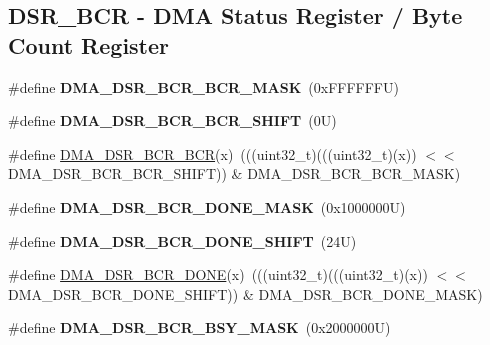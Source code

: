 \subsection*{D\+S\+R\+\_\+\+B\+CR -\/ D\+MA Status Register / Byte Count Register}
\begin{DoxyCompactItemize}
\item 
\mbox{\label{group___d_m_a___register___masks_ga51f1a407dbca889f0b21bb1eeaa1c5d0}} 
\#define {\bfseries D\+M\+A\+\_\+\+D\+S\+R\+\_\+\+B\+C\+R\+\_\+\+B\+C\+R\+\_\+\+M\+A\+SK}~(0x\+F\+F\+F\+F\+F\+F\+U)
\item 
\mbox{\label{group___d_m_a___register___masks_ga7eb36602370f4118640f57d51913ff89}} 
\#define {\bfseries D\+M\+A\+\_\+\+D\+S\+R\+\_\+\+B\+C\+R\+\_\+\+B\+C\+R\+\_\+\+S\+H\+I\+FT}~(0\+U)
\item 
\#define \mbox{\hyperlink{group___d_m_a___register___masks_gaa1f47d8804ae4a1f26265869b29a3a36}{D\+M\+A\+\_\+\+D\+S\+R\+\_\+\+B\+C\+R\+\_\+\+B\+CR}}(x)~(((uint32\+\_\+t)(((uint32\+\_\+t)(x)) $<$$<$ D\+M\+A\+\_\+\+D\+S\+R\+\_\+\+B\+C\+R\+\_\+\+B\+C\+R\+\_\+\+S\+H\+I\+FT)) \& D\+M\+A\+\_\+\+D\+S\+R\+\_\+\+B\+C\+R\+\_\+\+B\+C\+R\+\_\+\+M\+A\+SK)
\item 
\mbox{\label{group___d_m_a___register___masks_gaaa733d9c65fb074a9e836b8abaa8173f}} 
\#define {\bfseries D\+M\+A\+\_\+\+D\+S\+R\+\_\+\+B\+C\+R\+\_\+\+D\+O\+N\+E\+\_\+\+M\+A\+SK}~(0x1000000\+U)
\item 
\mbox{\label{group___d_m_a___register___masks_gaa9063734a56a62385b42210acedc3144}} 
\#define {\bfseries D\+M\+A\+\_\+\+D\+S\+R\+\_\+\+B\+C\+R\+\_\+\+D\+O\+N\+E\+\_\+\+S\+H\+I\+FT}~(24\+U)
\item 
\#define \mbox{\hyperlink{group___d_m_a___register___masks_gabce1208a3f9255c41fa7cbabdd2c4469}{D\+M\+A\+\_\+\+D\+S\+R\+\_\+\+B\+C\+R\+\_\+\+D\+O\+NE}}(x)~(((uint32\+\_\+t)(((uint32\+\_\+t)(x)) $<$$<$ D\+M\+A\+\_\+\+D\+S\+R\+\_\+\+B\+C\+R\+\_\+\+D\+O\+N\+E\+\_\+\+S\+H\+I\+FT)) \& D\+M\+A\+\_\+\+D\+S\+R\+\_\+\+B\+C\+R\+\_\+\+D\+O\+N\+E\+\_\+\+M\+A\+SK)
\item 
\mbox{\label{group___d_m_a___register___masks_ga517e206a9b5422e95b875d13973d6888}} 
\#define {\bfseries D\+M\+A\+\_\+\+D\+S\+R\+\_\+\+B\+C\+R\+\_\+\+B\+S\+Y\+\_\+\+M\+A\+SK}~(0x2000000\+U)

\end{DoxyCompactItemize}
